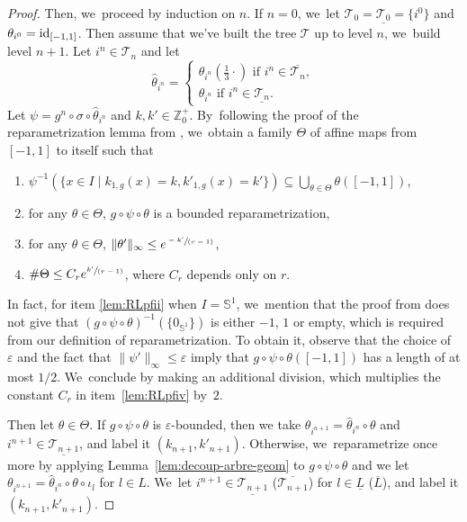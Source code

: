 \documentclass[10pt]{amsart}
\newenvironment{enumeratei}
{\bgroup\def\theenumi{\roman{enumi}}\def\theenumii{\arabic{enumii}}\begin{enumerate}}
{\end{enumerate}\egroup}
\newcommand{\spfrac}[2]{\sfrac{#1}{(#2)}}
\newcommand{\id}{\textup{id}}
\theoremstyle{definition}
\newcommand{\bbS}{{\mathbb{S}}}
\newcommand{\bbZ}{{\mathbb{Z}}}
\begin{document}
\begin{proof}
Then, we~proceed by induction on $n$.
If $n=0$, we~let $\mathcal{T}_0 = \underline{\mathcal{T}_0} = \{ i^0 \}$ and $\theta_{i^0} = \id_{[-1, 1]}$.
Then assume that we've built the tree $\mathcal{T}$ up to level $n$, we~build level $n+1$.
Let $i^n \in \mathcal{T}_n$ and let
\[
\hat{\theta}_{i^n} = \begin{cases}
\theta_{i^n} \left (\frac{1}{3} \cdot \right) \text{ if } i^n \in \overline{\mathcal{T}_n},\\
\theta_{i^n} \text{ if } i^n \in \underline{\mathcal{T}_n}.
\end{cases}
\]
Let $\psi = g^n \circ \sigma \circ \hat{\theta}_{i^n}$ and $k,k' \in \bbZ_0^+$. By~following the proof of the reparametrization lemma from \cite{MR4701884}, we~obtain a family $\Theta$ of affine maps from $[-1,1]$ to itself such that
\begin{enumeratei}
\item\label{lem:RLpfi}
$\psi^{-1} \left (\{ x \in I \mid k_{1,g}(x)=k, k'_{1,g}(x)=k'\} \right)\subseteq \bigcup_{\theta\in \Theta} \theta([-1,1])$,
\item\label{lem:RLpfii}
for any $\theta \in \Theta$, $g \circ \psi \circ \theta$ is a bounded reparametrization,
\item\label{lem:RLpfiii}
for any $\theta \in \Theta$, $\| \theta' \|_{\infty}\leq e^{\spfrac{-k'}{r-1}}$,
\item\label{lem:RLpfiv}
$\# \Theta\leq C_r e^{\spfrac{k'}{r-1}}$, where $C_r$ depends only on $r$.
\end{enumeratei}
In fact, for item \eqref{lem:RLpfii} when $I = \bbS^1$, we~mention that the proof from \cite{MR4701884} does not give that $(g \circ \psi \circ \theta)^{-1} (\{ 0_{\bbS^1} \})$ is either $-1$, $1$ or empty, which is required from our definition of reparametrization.
To obtain it, observe that the choice of $\varepsilon$ and the fact that $\| \psi' \|_{\infty} \leq \varepsilon$ imply that $g \circ \psi \circ \theta([-1,1])$ has a length of at most $1/2$. We~conclude by making an additional division, which multiplies the constant $C_r$ in item~\eqref{lem:RLpfiv} by~$2$.

Then let $\theta \in \Theta$. If $g \circ \psi \circ \theta$ is $\varepsilon$-bounded, then we take $\theta_{i^{n+1}} = \hat{\theta}_{i^n} \circ \theta$ and $i^{n+1} \in \underline{\mathcal{T}_{n+1}}$, and label it $(k_{n+1},k'_{n+1})$.
Otherwise, we~reparametrize once more by applying Lemma~\ref{lem:decoup-arbre-geom} to $g \circ \psi \circ \theta$ and we let $\theta_{i^{n+1}} = \hat{\theta}_{i^n} \circ \theta \circ \iota_l$ for $l \in L$. We~let $i^{n+1} \in \underline{\mathcal{T}_{n+1}}$ (\resp $\overline{\mathcal{T}_{n+1}}$) for $l \in \underline{L}$ (\resp $\overline{L}$), and label it $(k_{n+1},k'_{n+1})$.


\end{proof}
\end{document}
